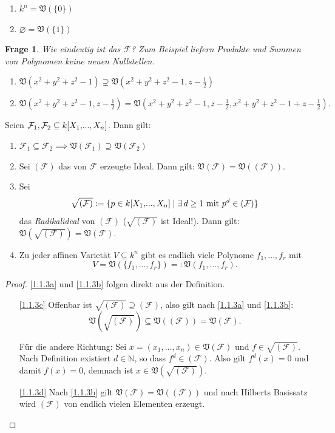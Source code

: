 \documentclass[a4paper,12pt]{scrbook}
\theoremstyle{keinenummern} %
\newtheorem{q}{Frage}
\theoremstyle{mitnummern}
\theoremstyle{unserbeweis}
\newtheorem{proof}{Beweis}
\def\V{\mathfrak{V}}
\newcommand{\F}{\mathcal{F}}
\newcommand{\leer}{\ensuremath{\varnothing}}
\renewcommand{\dotsc}{\ensuremath{\!...}}
\newcommand{\set}[1]{\ensuremath{\mathbb{#1}}}
\newcommand{\N}{\set{N}}
\newcommand{\polyx}[1][n]{\ensuremath%
  [X_{1},\dotsc,X_{#1}]}
\begin{document}
\begin{bsp}\label{bsp1.2}
\begin{enumerate}
\item $k^{n}=\V(\{0\})$
\item $\leer=\V(\{1\})$
\end{enumerate}
\end{bsp}

\begin{q}Wie eindeutig ist das $\F$? Zum Beispiel liefern Produkte und Summen von Polynomen keine neuen Nullstellen.
\end{q}

\begin{nbsp}\begin{enumerate}
\item $\V(x^{2}+y^{2}+z^{2}-1) \supsetneq \V(x^{2}+y^{2}+z^{2}-1, z-\frac{1}{2})$
\item $\V(x^{2}+y^{2}+z^{2}-1, z-\frac{1}{2}) = \V(x^{2}+y^{2}+z^{2}-1, z-\frac{1}{2}, x^{2}+y^{2}+z^{2}-1 + z-\frac{1}{2}).$
\end{enumerate}\end{nbsp}


\begin{bem}\label{1.1.3} Seien $\F_{1},\F_{2}\subseteq k\polyx$. Dann gilt:
\begin{enumerate}
\item{} $\F_{1}\subseteq\F_{2}\implies \V(\F_{1})\supseteq \V(\F_{2})$
\item{} Sei $(\F)$ das von $\F$ erzeugte Ideal. Dann gilt: $\V(\F) = \V((\F))$.
\item{} Sei
\[\sqrt{(\F)}:=\{p\in k\polyx\mid\exists\, d\geq 1\text{ mit }p^{d}\in(\F)\}\]
das \emph{Radikalideal} von $(\F)$ ($\sqrt{(\F)}$ ist Ideal!). Dann gilt: $\V(\sqrt{(\F)})=\V(\F)$.
\item{} Zu jeder affinen Varietät $V\subseteq k^{n}$ gibt es endlich viele Polynome $f_{1},\dotsc,f_{r}$ mit \[V=\V(\{f_{1},\dotsc,f_{r}\})=:\V(f_{1},\dotsc,f_{r}).\]
\end{enumerate}
\end{bem}

\begin{proof}\mbox{} %
\ref{1.1.3a} und \ref{1.1.3b} folgen direkt aus der Definition.
\begin{enumerate}%
\item[\ref{1.1.3c}] Offenbar ist $\sqrt{(\F)}\supseteq(\F)$, also gilt nach \ref{1.1.3a} und \ref{1.1.3b}: 
\[\V(\sqrt{(\F)})\subseteq \V((\F))=\V(\F).\]

Für die andere Richtung: Sei $x=(x_{1},\dotsc,x_{n})\in \V(\F)$ und $f\in\sqrt{(\F)}$. Nach Definition existiert $d\in\N$, so dass $f^{d}\in(\F)$. Also gilt $f^{d}(x)=0$ und damit $f(x)=0$, demnach ist $x\in \V(\sqrt{(\F)})$.
\item[\ref{1.1.3d}] Nach \ref{1.1.3b} gilt $\V(\F)=\V((\F))$ und nach Hilberts Basissatz wird $(\F)$ von endlich vielen Elementen erzeugt.
\end{enumerate}
\end{proof}
\end{document}
